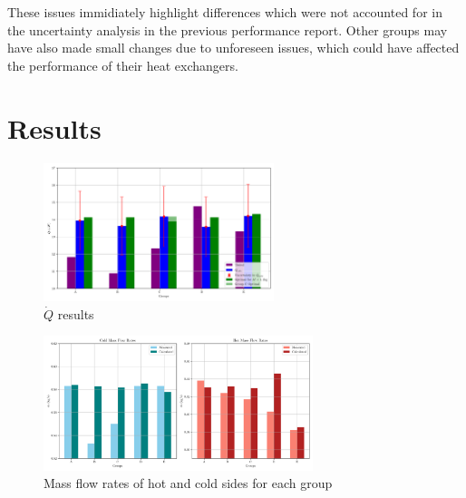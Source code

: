 \documentclass{article}
\begin{document}
These issues immidiately highlight differences which were not accounted for in the uncertainty analysis in the previous performance report.
Other groups may have also made small changes due to unforeseen issues, which could have affected the performance of their heat exchangers.

\section{Results}

\begin{figure}[H]
    \centering
    \includegraphics[width=0.6\textwidth]{2024_results.png}
    \caption{$\dot{Q}$ results}
    \label{fig:Qdot_results} 
\end{figure}

\begin{figure}[H]
    \centering
    \includegraphics[width=0.7\textwidth]{2024_mass_flow_rates.png}
    \caption{Mass flow rates of hot and cold sides for each group}
    \label{fig:mdot_results}
\end{figure}
\end{document}
